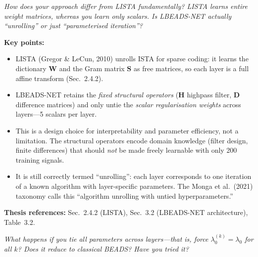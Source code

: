 \documentclass[11pt, letterpaper]{article}
\newcounter{qcounter}
\newcommand{\question}[1]{%
  \stepcounter{qcounter}%
  \begin{questionbox}[Q\theqcounter]%
    \itshape #1%
  \end{questionbox}%
}
\begin{document}
\question{How does your approach differ from LISTA fundamentally?  LISTA
learns entire weight matrices, whereas you learn only scalars.  Is
LBEADS-NET actually ``unrolling'' or just ``parameterised iteration''?}

\begin{answerbox}
\textbf{Key points:}
\begin{itemize}[nosep]
  \item LISTA (Gregor \& LeCun, 2010) unrolls ISTA for sparse coding:
        it learns the dictionary $\mathbf{W}$ and the Gram matrix
        $\mathbf{S}$ as free matrices, so each layer is a full affine
        transform (Sec.~2.4.2).
  \item LBEADS-NET retains the \emph{fixed structural operators}
        ($\mathbf{H}$ highpass filter, $\mathbf{D}$ difference matrices)
        and only untie the \emph{scalar regularisation weights} across
        layers---5 scalars per layer.
  \item This is a design choice for interpretability and parameter
        efficiency, not a limitation.  The structural operators encode
        domain knowledge (filter design, finite differences) that should
        \emph{not} be made freely learnable with only 200 training signals.
  \item It is still correctly termed ``unrolling'': each layer corresponds
        to one iteration of a known algorithm with layer-specific parameters.
        The Monga et al.\ (2021) taxonomy calls this
        ``algorithm unrolling with untied hyperparameters.''
\end{itemize}
\textbf{Thesis references:} Sec.~2.4.2 (LISTA), Sec.~3.2 (LBEADS-NET architecture), Table~3.2.
\end{answerbox}

\question{What happens if you tie all parameters across layers---that is,
force $\lambda_0^{(k)} = \lambda_0$ for all $k$?  Does it reduce to
classical BEADS?  Have you tried it?}
\end{document}
